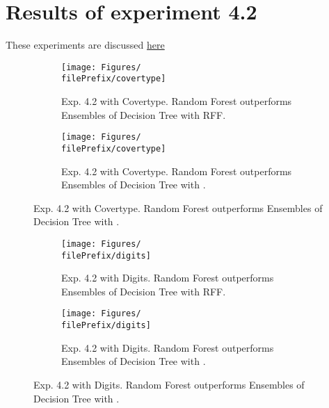 
\newcommand{\major}{4}
\newcommand{\minor}{2}

\newcommand{\undPrefix}{\major_\minor}
\newcommand{\dotPrefix}{\major.\minor}
\newcommand{\scoPrefix}{\major-\minor}
\newcommand{\filePrefix}{\undPrefix/rff}

\chapter{Results of experiment \dotPrefix} %


\label{Appendix\scoPrefix} %

These experiments are discussed \hyperref[disc:h4]{here}



\begin{figure}[H]
  \centering
  \renewcommand{\filePrefix}{\undPrefix/rff}
  \begin{subfigure}[t]{0.5\linewidth}
    \centering\captionsetup{width=.8\linewidth}\texttt{[image: Figures/\\filePrefix/covertype]}
    \caption{Exp. 4.2 with Covertype. Random Forest outperforms Ensembles of Decision Tree with RFF.}
    \label{fig:\undPrefix_covertype}
  \end{subfigure}%
  \renewcommand{\filePrefix}{\undPrefix/nys}%
  \begin{subfigure}[t]{0.5\linewidth}
    \centering\captionsetup{width=.8\linewidth}\texttt{[image: Figures/\\filePrefix/covertype]}
    \caption{Exp. 4.2 with Covertype. Random Forest outperforms Ensembles of Decision Tree with \Nys.}
    \label{fig:\undPrefix_covertype}
  \end{subfigure}%
\end{figure}


\begin{figure}[H]
  \centering
  \renewcommand{\filePrefix}{\undPrefix/rff}
  \begin{subfigure}[t]{0.5\linewidth}
    \centering\captionsetup{width=.8\linewidth}\texttt{[image: Figures/\\filePrefix/digits]}
    \caption{Exp. 4.2 with Digits. Random Forest outperforms Ensembles of Decision Tree with RFF.}
    \label{fig:\undPrefix_digits}
  \end{subfigure}%
  \renewcommand{\filePrefix}{\undPrefix/nys}%
  \begin{subfigure}[t]{0.5\linewidth}
    \centering\captionsetup{width=.8\linewidth}\texttt{[image: Figures/\\filePrefix/digits]}
    \caption{Exp. 4.2 with Digits. Random Forest outperforms Ensembles of Decision Tree with \Nys.}
    \label{fig:\undPrefix_digits}
  \end{subfigure}
\end{figure}


